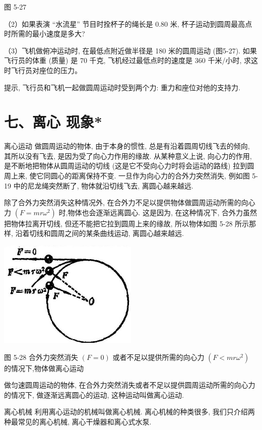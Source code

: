 \documentclass[10pt]{article}
\begin{document}
图 5-27

（2）如果表演 “水流星” 节目时拴杯子的绳长是 0.80 米, 杯子运动到圆周最高点时所需的最小速度是多大?

（3）飞机做俯冲运动时, 在最低点附近做半径是 180 米的圆周运动 (图5-27). 如果飞行员的体重 (质量) 是 70 千克, 飞机经过最低点时的速度是 360 千米/小时, 求这时飞行员对座位的压力。

提示, 飞行员和飞机一起做圆周运动时受到两个力: 重力和座位对他的支持力.

\section*{七、离心 现象*}

离心运动 做圆周运动的物体, 由于本身的惯性, 总是有沿着圆周切线飞去的倾向, 其所以没有飞去, 是因为受了向心力作用的缘故. 从某种意义上说, 向心力的作用, 是不断地把物体从圆周运动的切线 (这是它不受向心力时将会运动的路线) 拉到圆周上来, 使它同圆心的距离保持不变. 一旦作为向心力的合外力突然消失, 例如图 5-19 中的尼龙绳突然断了, 物体就沿切线飞去, 离圆心越来越远.

除了合外力突然消失这种情况外, 在合外力不足以提供物体做圆周运动所需的向心力 \(\left( {F = {mr}{\omega }^{2}}\right)\) 时,物体也会逐渐远离圆心. 这是因为, 在这种情况下, 合外力虽然把物体拉离开切线, 但还不能把它拉到圆周上来的缘故, 所以物体如图 5-28 所示那样, 沿着切线和圆周之间的某条曲线运动, 离圆心越来越远.

\begin{center}
\includegraphics[max width=0.5\textwidth]{images/01912d55-147c-70aa-b0e0-1782a122f948_152_490390.jpg}
\end{center}

图 5-28 合外力突然消失 \(\left( {F = 0}\right)\) 或者不足以提供所需的向心力 \(\left( {F < {mr}{\omega }^{2}}\right)\) 的情况下,物体做离心运动

做匀速圆周运动的物体, 在合外力突然消失或者不足以提供圆周运动所需的向心力的情况下, 做逐渐远离圆心的运动, 这种运动叫做离心运动.

离心机械 利用离心运动的机械叫做离心机械. 离心机械的种类很多, 我们只介绍两种最常见的离心机械, 离心干燥器和离心式水泵.
\end{document}
